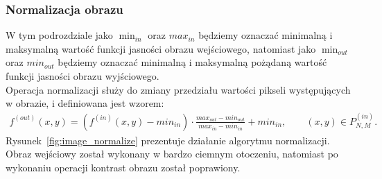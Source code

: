 \subsubsection{Normalizacja obrazu}
W tym podrozdziale jako $\min_{in}$ oraz $max_{in}$ będziemy oznaczać minimalną i maksymalną wartość funkcji jasności obrazu wejściowego, natomiast jako $\min_{out}$ oraz $min_{out}$ będziemy oznaczać minimalną i maksymalną pożądaną wartość funkcji jasności obrazu wyjściowego. \\
Operacja normalizacji służy do zmiany przedziału wartości pikseli występujących w obrazie, i definiowana jest wzorem:
\begin{gather*}
  f^{(out)}(x, y) = (f^{(in)}(x, y) - min_{in}) \cdot \frac{max_{out} - min_{out}}{max_{in} - min_{in}}+min_{in}, \quad \quad (x, y) \in P^{(in)}_{N,M}.
\end{gather*}
Rysunek~\ref{fig:image_normalize} prezentuje działanie algorytmu normalizacji. Obraz wejściowy został wykonany w bardzo ciemnym otoczeniu, natomiast po wykonaniu operacji kontrast obrazu został poprawiony.
